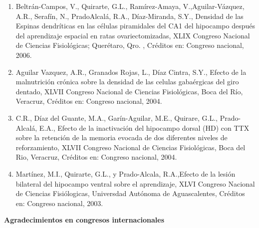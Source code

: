 \documentclass[12pt]{article}
\begin{document}
\begin{enumerate}
\item Beltrán-Campos, V., Quirarte, G.L., Ramírez-Amaya, V.,Aguilar-Vázquez, A.R., Serafín, N., PradoAlcalá, R.A., Díaz-Miranda, S.Y., 
Densidad de las Espinas dendríticas en las células piramidales del CA1 del hipocampo después del aprendizaje espacial en ratas 
ovariectomizadas, XLIX Congreso Nacional de Ciencias Fisiológicas; Querétaro, Qro. , Créditos en: Congreso nacional, 2006.

\item Aguilar Vazquez, A.R., Granados Rojas, L., Díaz Cintra, S.Y., Efecto de la malnutrición crónica sobre la densidad de las celulas 
gabaérgicas del giro dentado, XLVII Congreso Nacional de Ciencias Fisiológicas, Boca del Río, Veracruz, Créditos en: Congreso nacional, 
2004.

\item C.R., Díaz del Guante, M.A., Garín-Aguilar, M.E., Quirare, G.L., Prado-Alcalá, E.A., Efecto de la inactivación del hipocampo 
dorsal 
(HD) con TTX sobre la retención de la memoria evocada de dos diferentes niveles de reforzamiento, XLVII Congreso Nacional de Ciencias 
Fisiológicas, Boca del Rio, Veracruz, Créditos en: Congreso nacional, 2004.

\item Martínez, M.I., Quirarte, G.L., y Prado-Alcala, R.A.,Efecto de la lesión bilateral del hipocampo ventral sobre el aprendizaje, 
XLVI 
Congreso Nacional de Ciencias Fisiólogicas, Universdad Autónoma de Aguascalentes, Créditos en: Congreso nacional, 2003.
\end{enumerate}

\textbf{Agradecimientos en congresos internacionales}
\end{document}
